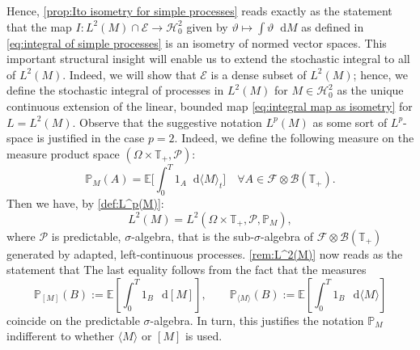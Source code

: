 \documentclass[11pt,a4paper,twoside,openany]{report}
\newcommand{\diff}{\mathop{}\!\mathrm{d}}
\theoremstyle{plain} %
\theoremstyle{definition} %
\theoremstyle{remark} %
\begin{document}
Hence, \cref{prop:Ito isometry for simple processes} reads exactly as the statement that the map \(I:L^2(M)\cap\mathcal{E}\to\mathcal{H}^2_0\) given by \(\vartheta\mapsto \int \vartheta\diff M\) as defined in \cref{eq:integral of simple processes} is an isometry of normed vector spaces. This important structural insight will enable us to extend the stochastic integral to all of \(L^2(M)\). Indeed, we will show that \(\mathcal{E}\) is a dense subset of \(L^2(M)\); hence, we define the stochastic integral of processes in \(L^2(M)\) for \(M\in\mathcal{H}_0^2\) as the unique continuous extension of the linear, bounded map \cref{eq:integral map as isometry} for \(L=L^2(M)\).
\bigbreak
Observe that the suggestive notation \(L^p(M)\) as some sort of \(L^p\)-space is justified in the case \(p=2\). Indeed, we define the following measure on the measure product space \(\left(\Omega\times\mathbb{T}_+,\mathcal{P}\right)\):
\begin{equation}
    \mathbb{P}_M(A)=\mathbb{E}\bigg[\int_0^{T}1_A\diff\langle M\rangle_t\bigg]\quad\forall A\in\mathcal{F}\otimes\mathcal{B}(\mathbb{T}_+).
\end{equation}
 Then we have, by \cref{def:L^p(M)}:
\begin{equation}\label{eq:L^2(M) as Hilbert space}
    L^2(M) = L^2(\Omega\times \mathbb{T}_+,\mathcal{P},\mathbb{P}_M),
\end{equation}
where \(\mathcal{P}\) is predictable, \(\sigma\)-algebra, that is the sub-\(\sigma\)-algebra of \(\mathcal{F}\otimes\mathcal{B}(\mathbb{T}_+)\) generated by adapted, left-continuous processes. \cref{rem:L^2(M)} now reads as the statement that 
The last equality follows from the fact that the measures
\begin{equation}
    \mathbb{P}_{[M]}(B):=\mathbb E\left[\int_0^T 1_B\,\diff [M]\right],
\qquad
\mathbb{P}_{\langle M\rangle}(B):=\mathbb E\left[\int_0^T 1_B\,\diff \langle M\rangle\right]
\end{equation}
coincide on the predictable \(\sigma\)-algebra. In turn, this justifies the notation \(\mathbb{P}_M\) indifferent to whether \(\langle M\rangle\) or \([M]\) is used.
\end{document}
